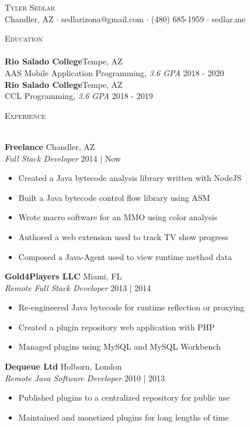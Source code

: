\documentclass[a4paper]{article}
\newcommand{\lineunder} {
    \vspace*{-8pt} \\
    \hspace*{-18pt} \hrulefill \\
}
\newcommand{\header} [1] {
    {\hspace*{-18pt}\vspace*{6pt} \textsc{#1}}
    \vspace*{-6pt} \lineunder
}
\begin{document}
\vspace*{-40pt}

\vspace*{-10pt}
\begin{center}
	{\Huge \scshape {Tyler Sedlar}}\\
	Chandler, AZ $\cdot$ sedlarizona@gmail.com $\cdot$ (480) 685-1959 $\cdot$ sedlar.me\\
\end{center}

\header{Education}
\textbf{Rio Salado College}\hfill Tempe, AZ\\
AAS Mobile Application Programming, \textit{3.6 GPA} \hfill 2018 - 2020\\
\vspace{2mm}
\textbf{Rio Salado College}\hfill Tempe, AZ\\
CCL Programming, \textit{3.6 GPA} \hfill 2018 - 2019\\
\vspace{2mm}

\header{Experience}
\vspace{1mm}

\textbf{Freelance} \hfill Chandler, AZ\\
\textit{Full Stack Developer} \hfill 2014 | Now\\
\vspace{-1mm}
\begin{itemize} \itemsep 1pt
	\item Created a Java bytecode analysis library written with NodeJS
	\item Built a Java bytecode control flow library using ASM
	\item Wrote macro software for an MMO using color analysis
	\item Authored a web extension used to track TV show progress
	\item Composed a Java-Agent used to view runtime method data
\end{itemize}
\textbf{Gold4Players LLC} \hfill Miami, FL\\
\textit{Remote Full Stack Developer} \hfill 2013 | 2014\\
\vspace{-1mm}
\begin{itemize} \itemsep 1pt
	\item Re-engineered Java bytecode for runtime reflection or proxying
	\item Created a plugin repository web application with PHP
	\item Managed plugins using MySQL and MySQL Workbench
\end{itemize}
\textbf{Dequeue Ltd} \hfill Holborn, London\\
\textit{Remote Java Software Developer} \hfill 2010 | 2013\\
\vspace{-1mm}
\begin{itemize} \itemsep 1pt
	\item Published plugins to a centralized repository for public use
	\item Maintained and monetized plugins for long lengths of time
\end{itemize}
\end{document}
